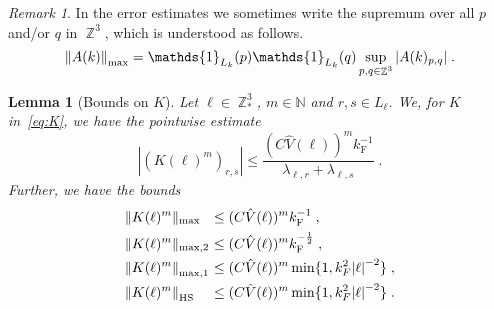 \documentclass[12pt,a4paper]{article}
\numberwithin{equation}{section}
\newcommand{\1}{\mathbb{I}}
\newcommand{\F}{\mathrm{F}}
\newcommand{\HS}{\mathrm{HS}}
\DeclareMathOperator{\Z}{\mathbb{Z}}
\newcommand{\normmaxi}[1]{\norm{#1}_{\mathrm{max,1}}}
\theoremstyle{plain}
\newtheorem{lemma}[theorem]{Lemma}
\theoremstyle{definition}
\theoremstyle{remark}
\newtheorem{remark}[theorem]{Remark}
\theoremstyle{plain}
\theoremstyle{definition}
\theoremstyle{remark}
\begin{document}
\begin{remark}
	In the error estimates we sometimes write the supremum over all $p$ and/or $q$ in $\Z^3$, which is understood as follows.
\begin{equation}
	\norm{A(k)}_{\max} = \mathds{1}_{L_k}(p)\mathds{1}_{L_k}(q) \sup\limits_{p,q \in \Z^3}\abs{A(k)_{p,q}} \;.
\end{equation} 	
\end{remark}	


\begin{lemma}[Bounds on $ K $]\label{lem:normsk}
Let $ \ell \in \Z^3_* $, $ m \in \mathbb{N} $ and $ r,s \in L_\ell $. We, for $ K $ in~\eqref{eq:K}, we have the pointwise estimate
\begin{equation} \label{eq:K_element_bounds}
	|(K(\ell)^m)_{r,s}|
	\le \frac{(C \hat{V}(\ell))^m k_{\F}^{-1}}{\lambda_{\ell,r} + \lambda_{\ell,s}} \;.
\end{equation}
Further, we have the bounds
\begin{equation} \label{eq:K_max_bounds}
\begin{aligned}
	&\Vert K(\ell)^m \Vert_{\max}\!\!\!\!
	&\le\; &(C \hat{V}(\ell))^m k_{\F}^{-1} \;, \\ 
	&\Vert K(\ell)^m \Vert_{\max,2}\!\!\!\!
	&\le \;&(C \hat{V}(\ell))^m k_{\F}^{-\frac 12} \;, \\
	&\normmaxi{K(\ell)^m}\!\!\!\!
	&\leq \; &(C \hat{V}(\ell))^m \min\{1,k^2_F\abs{\ell}^{-2}\} \;,\\
	&\norm{K(\ell)^m}_{\HS}\!\!\!\!
	&\le \;&(C \hat{V}(\ell))^m \min\{1,k^2_F\abs{\ell}^{-2}\} \;.
\end{aligned}   
\end{equation}
\end{lemma}
\end{document}
